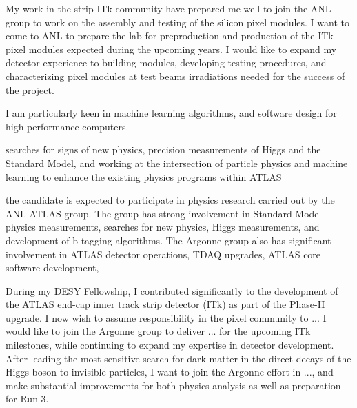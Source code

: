 \documentclass[a4paper]{article}
\begin{document}
My work in the strip ITk community have prepared me well to join the ANL group to work on the assembly and testing of the silicon pixel modules. I want to come to ANL to prepare the lab for preproduction and production of the ITk pixel modules expected during the upcoming years.
I would like to expand my detector experience to building modules, developing testing procedures, and characterizing pixel modules at test beams
irradiations needed for the success of the project.





I am particularly keen in machine learning algorithms, and software design for high-performance computers.


searches for signs of new physics, precision measurements of Higgs and the Standard Model, and working at the intersection of particle physics and machine learning to enhance the existing physics programs within ATLAS



the candidate is expected to participate in physics research carried out by the ANL ATLAS group. The group has strong involvement in Standard Model physics measurements, searches for new physics, Higgs measurements, and development of b-tagging algorithms. The Argonne group also has significant involvement in ATLAS detector operations, TDAQ upgrades, ATLAS core software development,



During my DESY Fellowship, I contributed significantly to the development of the ATLAS end-cap inner track strip detector (ITk) as part of the Phase-II upgrade. I now wish to assume responsibility in the pixel community to ...
I would like to join the Argonne group to deliver ... for the upcoming ITk milestones, while continuing to expand my expertise in detector development.
After leading the most sensitive search for dark matter in the direct decays of the Higgs boson to invisible particles, I want to join the
Argonne effort in ..., and make substantial improvements for both physics analysis as well as preparation for Run-3.
\end{document}
